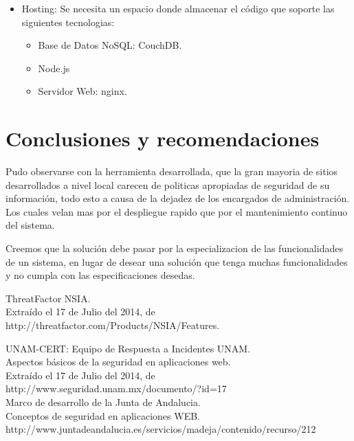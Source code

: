\documentclass[letter,twoside,11pt]{article}
\begin{document}
\begin{itemize}
\item Hosting: Se necesita un espacio donde almacenar el código que soporte las
    siguientes tecnologias:
    \begin{itemize}
    \item Base de Datos NoSQL: CouchDB.
    \item Node.js
    \item Servidor Web: nginx.
    \end{itemize}
\end{itemize}

\section{Conclusiones y recomendaciones}
Pudo observarse con la herramienta desarrollada, que la gran mayoria de sitios
desarrollados a nivel local carecen de politicas apropiadas de seguridad de su
información, todo esto a causa de la dejadez de los encargados de
administración. Los cuales velan mas por el despliegue rapido que por el
mantenimiento continuo del sistema.

Creemos que la solución debe pasar por la especializacion de las funcionalidades
de un sistema, en lugar de desear una solución que tenga muchas funcionalidades
y no cumpla con las especificaciones desedas.

\begin{thebibliography}{99}

     ThreatFactor NSIA.\\
    Extraído el 17 de Julio del 2014, de\\
    http://threatfactor.com/Products/NSIA/Features.

     UNAM-CERT: Equipo de Respuesta a Incidentes UNAM.\\
    Aspectos básicos de la seguridad en aplicaciones web.\\
    Extraído el 17 de Julio del 2014, de\\
    http://www.seguridad.unam.mx/documento/?id=17\\

     Marco de desarrollo de la Junta de Andalucia.\\
    Conceptos de seguridad en aplicaciones WEB.\\
    http://www.juntadeandalucia.es/servicios/madeja/contenido/recurso/212\\
\end{thebibliography}
\end{document}
